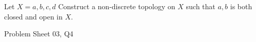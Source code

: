 \begin{samepage}
\begin{ex}
Let $X = {{ a, b, c, d }}$ Construct a non-discrete topology on $X$ such that ${{ a, b }}$ is both closed and open in $X$.
\end{ex}
\begin{source}
Problem Sheet 03, Q4
\end{source}
\end{samepage}
